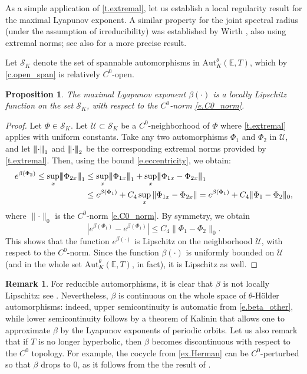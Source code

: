 \documentclass[10pt]{amsart}
\let\mathcal\mathscr
\theoremstyle{plain}
\newtheorem{proposition}[theorem]{Proposition}
\theoremstyle{definition}
\newtheorem{remark}[theorem]{Remark}
\newcommand{\tribar}[1]{\mathopen{| {\kern -1.5pt} | {\kern -1.5pt} |} {#1}
\mathclose{| {\kern -1.5pt} | {\kern -1.5pt} |}}
\newcommand{\EE}{\mathbb{E}}
\newcommand{\cS}{\mathcal{S}}
\newcommand{\cU}{\mathcal{U}}
\newcommand{\Aut}{\mathrm{Aut}}
\begin{document}
\label{ss.Wirth}

As a simple application of \cref{t.extremal}, let us establish a local regularity result for the maximal Lyapunov exponent. A similar property for the joint spectral radius (under the assumption of irreducibility) was established by Wirth \cite[Cor.\,4.2]{Wirth}, also using extremal norms; see also \cite{Kozyakin} for a more precise result.

Let $\cS_K$ denote the set of spannable automorphisms in $\Aut^\theta_K(\EE,T)$, which by \cref{c.open_span} is relatively $C^0$-open.

\begin{proposition}\label{p.Wirth}
The maximal Lyapunov exponent $\beta(\mathord{\cdot})$ is a locally Lipschitz function on the set $\cS_K$, with respect to the $C^0$-norm \eqref{e.C0_norm}.
\end{proposition}

\begin{proof}
Let $\Phi \in \cS_K$.
Let $\cU \subset \cS_K$ be a $C^0$-neighborhood of $\Phi$ where \cref{t.extremal} applies with uniform constants.
Take any two automorphisms $\Phi_1$ and $\Phi_2$ in $\cU$, and let $\tribar{\mathord{\cdot}}_1$ and $\tribar{\mathord{\cdot}}_2$ be the corresponding extremal norms provided by \cref{t.extremal}.
Then, using the bound \eqref{e.eccentricity}, we obtain:
\begin{align*}
e^{\beta(\Phi_2)}	\le \sup_x \tribar{\Phi_{2x}}_1
					&\le \sup_x \tribar{\Phi_{1x}}_1 + \sup_x \tribar{\Phi_{1x} - \Phi_{2x}}_1 \\
					&\le e^{\beta(\Phi_1)} + C_4 \sup_x \| \Phi_{1x} - \Phi_{2x} \|
					= e^{\beta(\Phi_1)} + C_4 \|\Phi_1 - \Phi_2\|_0,
\end{align*}
where $\| \mathord{\cdot} \|_0$ is the $C^0$-norm \eqref{e.C0_norm}.
By symmetry, we obtain
\[
|e^{\beta(\Phi_1)} - e^{\beta(\Phi_1)}| \le C_4 \|\Phi_1 - \Phi_2\|_0.
\]
This shows that the function $e^{\beta(\mathord{\cdot})}$ is Lipschitz on the neighborhood $\cU$, with respect to the $C^0$-norm.
Since the function $\beta(\mathord{\cdot})$ is uniformly bounded on $\cU$ (and in the whole set $\Aut^\theta_K(\EE,T)$, in fact), it is Lipschitz as well.
\end{proof}

\begin{remark}\label{r.regularity_beta}
For reducible automorphisms, it is clear that $\beta$ is not locally Lipschitz: see \eg \cite[p.\,27]{Wirth}.
Nevertheless, $\beta$ is continuous on the whole space of $\theta$-Hölder automorphisms: indeed, upper semicontinuity is automatic from \eqref{e.beta_other}, while lower semicontinuity follows by a theorem of Kalinin \cite[Th.\,1.4]{Kalinin} that allows one to approximate $\beta$ by the Lyapunov exponents of periodic orbits. Let us also remark that if $T$ is no longer hyperbolic, then $\beta$ becomes discontinuous with respect to the $C^0$ topology.
For example, the cocycle from \cref{ex.Herman} can be $C^0$-perturbed so that $\beta$ drops to $0$, as it follows \eg from the the result of \cite{AB}.
\end{remark}
\end{document}
